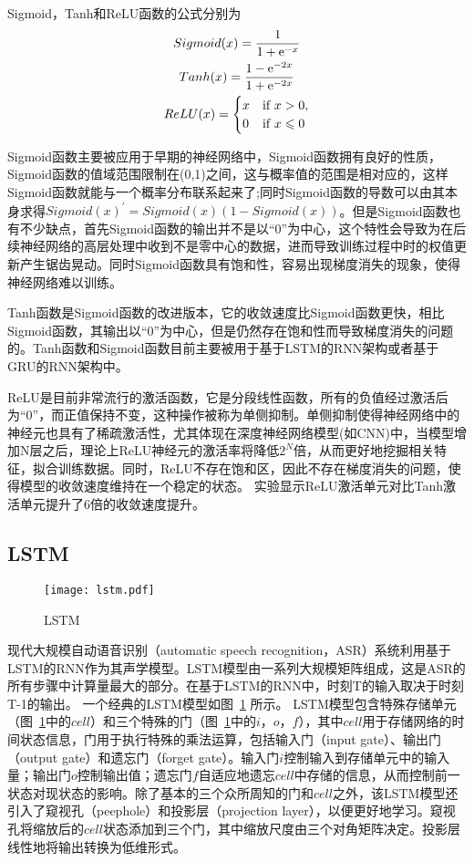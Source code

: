 Sigmoid，Tanh和ReLU函数的公式分别为
\begin{gather}
Sigmoid(x) = \frac{1}{1 + \mathrm{e}^{-x}} \\
Tanh(x) = \frac{1-\mathrm{e}^{-2x}}{1+\mathrm{e}^{-2x}} \\
ReLU(x)=
\begin{cases}
x & \text{if } x > 0, \\
0 & \text{if } x \leqslant 0
\end{cases}
\end{gather}

Sigmoid函数主要被应用于早期的神经网络中，Sigmoid函数拥有良好的性质，Sigmoid函数的值域范围限制在(0,1)之间，这与概率值的范围是相对应的，这样Sigmoid函数就能与一个概率分布联系起来了;同时Sigmoid函数的导数可以由其本身求得$Sigmoid(x)^{'}=Sigmoid(x)(1-Sigmoid(x))$。但是Sigmoid函数也有不少缺点，首先Sigmoid函数的输出并不是以“0”为中心，这个特性会导致为在后续神经网络的高层处理中收到不是零中心的数据，进而导致训练过程中时的权值更新产生锯齿晃动。同时Sigmoid函数具有饱和性，容易出现梯度消失的现象，使得神经网络难以训练。

Tanh函数是Sigmoid函数的改进版本，它的收敛速度比Sigmoid函数更快，相比Sigmoid函数，其输出以“0”为中心，但是仍然存在饱和性而导致梯度消失的问题的。Tanh函数和Sigmoid函数目前主要被用于基于LSTM的RNN架构或者基于GRU的RNN架构中。

ReLU是目前非常流行的激活函数，它是分段线性函数，所有的负值经过激活后为“0”，而正值保持不变，这种操作被称为单侧抑制。单侧抑制使得神经网络中的神经元也具有了稀疏激活性，尤其体现在深度神经网络模型(如CNN)中，当模型增加N层之后，理论上ReLU神经元的激活率将降低$2^N$倍，从而更好地挖掘相关特征，拟合训练数据。同时，ReLU不存在饱和区，因此不存在梯度消失的问题，使得模型的收敛速度维持在一个稳定的状态。
实验显示ReLU激活单元对比Tanh激活单元提升了6倍的收敛速度提升\cite{krizhevsky2012imagenet}。

\subsection{LSTM}

\begin{figure}[h]
\centering
\texttt{[image: lstm.pdf]}
\caption{\footnotesize LSTM}
\label{fig:lstm}
\end{figure}

现代大规模自动语音识别（automatic speech recognition，ASR）系统利用基于LSTM的RNN作为其声学模型。LSTM模型由一系列大规模矩阵组成，这是ASR的所有步骤中计算量最大的部分。在基于LSTM的RNN中，时刻T的输入取决于时刻T-1的输出。
一个经典的LSTM模型如图~\ref{fig:lstm} 所示。
LSTM模型包含特殊存储单元（图~\ref{fig:lstm}中的$cell$）和三个特殊的门（图~\ref{fig:lstm}中的$i$，$o$，$f$），其中$cell$用于存储网络的时间状态信息，门用于执行特殊的乘法运算，包括输入门（input gate）、输出门（output gate）和遗忘门（forget gate）。输入门$i$控制输入到存储单元中的输入量；输出门$o$控制输出值；遗忘门$f$自适应地遗忘$cell$中存储的信息，从而控制前一状态对现状态的影响。除了基本的三个众所周知的门和$cell$之外，该LSTM模型还引入了窥视孔（peephole）和投影层（projection layer），以便更好地学习。窥视孔将缩放后的$cell$状态添加到三个门，其中缩放尺度由三个对角矩阵决定。投影层线性地将输出转换为低维形式。

